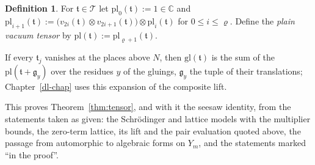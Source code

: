 \documentclass[reqno]{amsart}
\newcounter{chap}
\theoremstyle{definition}
\newtheorem{definition}{Definition}[section]
\theoremstyle{plain}
\newcommand{\C}{\mathbb{C}}
\newcommand{\Tc}{\mathcal{T}}
\newcommand{\gl}{\mathrm{gl}}
\newcommand{\pl}{\mathrm{pl}}
\begin{document}
\begin{definition}\label{def:plain}
For \(\mathfrak t\in\Tc\) let \(\pl_0(\mathfrak t):=1\in\C\) and \(\pl_{i+1}(\mathfrak t):=\bigl(v_{2i}(\mathfrak t)\otimes v_{2i+1}(\mathfrak t)\bigr)\otimes\pl_i(\mathfrak t)\) for \(0\le i\le\varrho\).  Define the \emph{plain vacuum tensor} by \(\pl(\mathfrak t):=\pl_{\varrho+1}(\mathfrak t)\).
\end{definition}

If every \(\mathfrak t_j\) vanishes at the places above \(N\), then \(\gl(\mathfrak t)\) is the sum of the \(\pl(\mathfrak t+\mathfrak g_y)\) over the residues \(y\) of the gluings, \(\mathfrak g_y\) the tuple of their translations; Chapter~\ref{dl-chap} uses this expansion of the composite lift.

This proves Theorem~\ref{thm:tensor}, and with it the seesaw identity, from the statements taken as given: the Schr\"odinger and lattice models with the multiplier bounds, the zero-term lattice, its lift and the pair evaluation quoted above, the passage from automorphic to algebraic forms on \(Y_m\), and the statements marked ``in the proof''.
\end{document}
